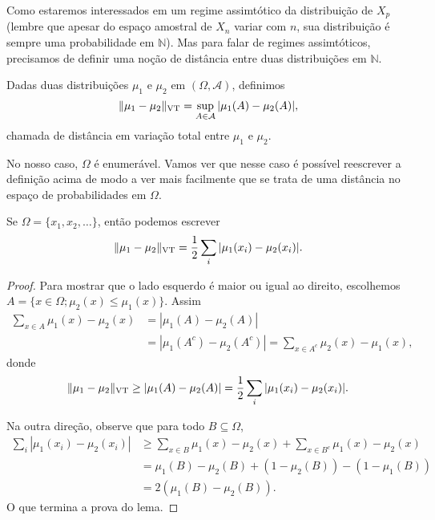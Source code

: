 \begin{topics}
Como estaremos interessados em um regime assimtótico da distribuição de $X_p$ (lembre que apesar do espaço amostral de $X_n$ variar com $n$, sua distribuição é sempre uma probabilidade em $\mathbb{N}$).
Mas para falar de regimes assimtóticos, precisamos de definir uma noção de distância entre duas distribuições em $\mathbb{N}$.

\begin{definition}
Dadas duas distribuições $\mu_1$ e $\mu_2$ em $(\Omega, \mathcal{A})$, definimos
\begin{equation}
  \lVert \mu_1 - \mu_2 \rVert_{\operatorname{VT}} = \sup_{A \in \mathcal{A}} |\mu_1(A) - \mu_2(A)|,
\end{equation}
 chamada de distância em variação total  entre $\mu_1$ e $\mu_2$.
\end{definition}

No nosso caso, $\Omega$ é enumerável.
Vamos ver que nesse caso é possível reescrever a definição acima de modo a ver mais facilmente que se trata de uma distância no espaço de probabilidades em $\Omega$.

\begin{lemma}
\label{l:vt_l1}
Se $\Omega = \{x_1, x_2, \dots\}$, então podemos escrever
\begin{equation}
  \lVert \mu_1 - \mu_2 \rVert_{\operatorname{VT}} = \frac{1}{2} \sum_{i} |\mu_1(x_i) - \mu_2(x_i)|.
\end{equation}
\end{lemma}

\begin{proof}
Para mostrar que o lado esquerdo é maior ou igual ao direito, escolhemos $A = \{ x \in \Omega; \mu_2(x) \leq \mu_1(x)\}$. Assim
\begin{equation}
  \begin{split}
    \sum_{x \in A} \mu_1(x) - \mu_2(x) & = |\mu_1(A) - \mu_2(A)|\\
    & = |\mu_1(A^c) - \mu_2(A^c)| = \sum_{x \in A^c} \mu_2(x) - \mu_1(x),
  \end{split}
\end{equation}
donde
\begin{equation}
  \lVert \mu_1 - \mu_2 \rVert_{\operatorname{VT}} \geq |\mu_1(A) - \mu_2(A)| = \frac{1}{2} \sum_{i} |\mu_1(x_i) - \mu_2(x_i)|.
\end{equation}

Na outra direção, observe que para todo $B \subseteq \Omega$,
\begin{equation}
  \begin{split}
    \sum_{i} |\mu_1(x_i) - \mu_2(x_i)| & \geq \sum_{x \in B} \mu_1(x) - \mu_2(x) + \sum_{x \in B^c} \mu_1(x) - \mu_2(x)\\
    & = \mu_1(B) - \mu_2(B) + (1 - \mu_2(B)) - (1 - \mu_1(B))\\
    & = 2(\mu_1(B) - \mu_2(B)).
  \end{split}
\end{equation}
O que termina a prova do lema.
\end{proof}


\end{topics}
